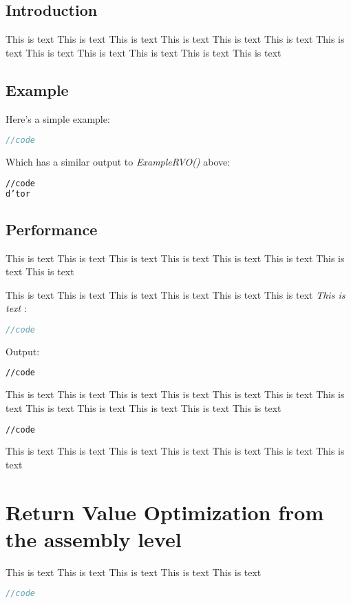 \documentclass[a4paper]{uestcreport}
\begin{document}
\subsection{Introduction}
This is text This is text This is text This is text This is text This is text This is text 
This is text This is text This is text This is text This is text 

\subsection{Example}
Here’s a simple example:
\begin{lstlisting}[language=C++]
//code
\end{lstlisting}

Which has a similar output to \textit{ExampleRVO()} above:
\begin{lstlisting}[language=sh]
//code
d’tor
\end{lstlisting}

\subsection{Performance}
This is text This is text This is text This is text This is text This is text This is text This is text 

This is text This is text This is text This is text This is text This is text  \textit{This is text }:
\begin{lstlisting}[language=C++]
//code
\end{lstlisting}

Output:
\begin{lstlisting}[language=sh]
//code
\end{lstlisting}

This is text This is text This is text This is text This is text This is text This is text This is text This is text This is text This is text This is text 
\begin{lstlisting}[language=sh]
//code
\end{lstlisting}

This is text This is text This is text This is text This is text This is text This is text 

\section{Return Value Optimization from the assembly level}
This is text This is text This is text This is text This is text 
\begin{lstlisting}[language=C++]
//code
\end{lstlisting}
\end{document}
